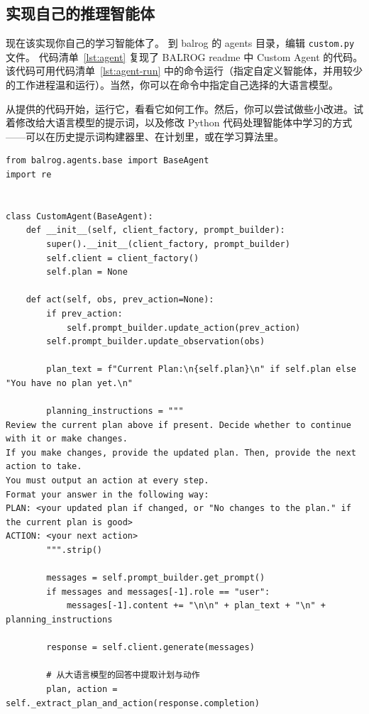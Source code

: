\subsection{实现自己的推理智能体}
现在该实现你自己的学习智能体了。
到 balrog 的 agents 目录，编辑 \verb|custom.py| 文件。
代码清单~\ref{lst:agent} 复现了 BALROG readme 中 Custom Agent 的代码。该代码可用代码清单~\ref{lst:agent-run} 中的命令运行（指定自定义智能体，并用较少的工作进程温和运行）。当然，你可以在命令中指定自己选择的大语言模型。

从提供的代码开始，运行它，看看它如何工作。然后，你可以尝试做些小改进。试着修改给大语言模型的提示词，以及修改 Python 代码处理智能体中学习的方式——可以在历史提示词构建器里、在计划里，或在学习算法里。

\begin{listing}
\begin{verbatim}
from balrog.agents.base import BaseAgent
import re


class CustomAgent(BaseAgent):
    def __init__(self, client_factory, prompt_builder):
        super().__init__(client_factory, prompt_builder)
        self.client = client_factory()
        self.plan = None

    def act(self, obs, prev_action=None):
        if prev_action:
            self.prompt_builder.update_action(prev_action)
        self.prompt_builder.update_observation(obs)

        plan_text = f"Current Plan:\n{self.plan}\n" if self.plan else "You have no plan yet.\n"

        planning_instructions = """
Review the current plan above if present. Decide whether to continue with it or make changes.
If you make changes, provide the updated plan. Then, provide the next action to take. 
You must output an action at every step.
Format your answer in the following way:
PLAN: <your updated plan if changed, or "No changes to the plan." if the current plan is good>
ACTION: <your next action>
        """.strip()

        messages = self.prompt_builder.get_prompt()
        if messages and messages[-1].role == "user":
            messages[-1].content += "\n\n" + plan_text + "\n" + planning_instructions

        response = self.client.generate(messages)

        # 从大语言模型的回答中提取计划与动作
        plan, action = self._extract_plan_and_action(response.completion)


\end{verbatim}
\end{listing}
